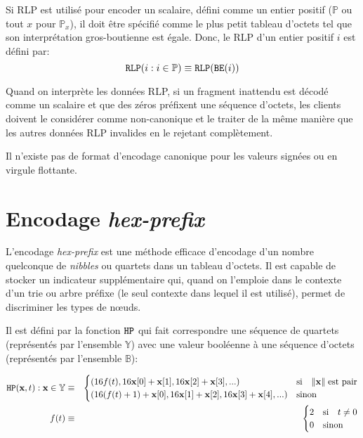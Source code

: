 \documentclass[9pt,oneside]{amsart}
\begin{document}
Si RLP est utilisé pour encoder un scalaire, défini comme un entier positif ($\mathbb{P}$ ou tout $x$ pour $\mathbb{P}_x$), il doit être spécifié comme le plus petit tableau d'octets tel que son interprétation gros-boutienne est égale. Donc, le RLP d'un entier positif $i$ est défini par:
\begin{equation}
\mathtt{\tiny RLP}(i : i \in \mathbb{P}) \equiv \mathtt{\tiny RLP}(\mathtt{\tiny BE}(i))
\end{equation}

Quand on interprète les données RLP, si un fragment inattendu est décodé comme un scalaire et que des zéros préfixent une séquence d'octets, les clients doivent le considérer comme non-canonique et le traiter de la même manière que les autres données RLP invalides en le rejetant complètement.

Il n'existe pas de format d'encodage canonique pour les valeurs signées ou en virgule flottante.

\section{Encodage \textit{hex-prefix}}\label{app:hexprefix}
L'encodage \textit{hex-prefix} est une méthode efficace d'encodage d'un nombre quelconque de \textit{nibbles} ou quartets dans un tableau d'octets. Il est capable de stocker un indicateur supplémentaire qui, quand on l'emploie dans le contexte d'un trie ou arbre préfixe (le seul contexte dans lequel il est utilisé), permet de discriminer les types de n\oe{}uds.

Il est défini par la fonction $\mathtt{\tiny HP}$ qui fait correspondre une séquence de quartets (représentés par l'ensemble  $\mathbb{Y}$) avec une valeur booléenne à une séquence d'octets (représentés par l'ensemble $\mathbb{B}$):

\begin{eqnarray}
\mathtt{\tiny HP}(\mathbf{x}, t): \mathbf{x} \in \mathbb{Y} & \equiv & \begin{cases}
(16f(t), 16\mathbf{x}[0] + \mathbf{x}[1], 16\mathbf{x}[2] + \mathbf{x}[3], ...) &
\text{si} \quad \lVert \mathbf{x} \rVert \; \text{est pair} \\
(16(f(t) + 1) + \mathbf{x}[0], 16\mathbf{x}[1] + \mathbf{x}[2], 16\mathbf{x}[3] + \mathbf{x}[4], ...) &
\text{sinon}
\end{cases} \\
f(t) & \equiv & \begin{cases} 2 & \text{si} \quad t \neq 0 \\ 0 & \text{sinon} \end{cases}
\end{eqnarray}
\end{document}

